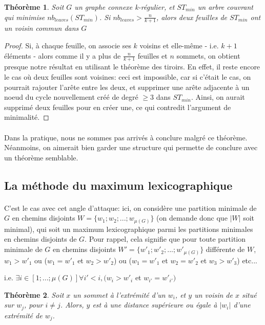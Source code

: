 \documentclass[a4paper]{article}
\newtheorem{theorem}{Théorème}
\theoremstyle{definition}
\theoremstyle{remark}
\begin{document}
\begin{theorem}
Soit $G$ un graphe connexe k-régulier, et $ST_{min}$ un arbre couvrant 
qui minimise $nb_{leaves}(ST_{min})$. Si $nb_{leaves} > \frac{n}{k+1}$,
alors deux feuilles de $ST_{min}$ ont un voisin commun dans $G$
\end{theorem}
\begin{proof}
Si, à chaque feuille, on associe ses $k$ voisins et elle-même - i.e. $k+1$ éléments - alors comme il y a plus de $\frac{n}{k+1}$ feuilles et $n$
sommets, on obtient presque notre résultat en utilisant le théorème des
tiroirs. En effet, il reste encore le cas où deux feuilles sont
voisines: ceci est impossible, car si c'était le cas, on pourrait 
rajouter l'arête entre les deux, et supprimer une arête adjacente à un
noeud du cycle nouvellement créé de degré $\geq 3$ dans $ST_{min}$. 
Ainsi, on aurait supprimé deux feuilles pour en créer une, ce qui contredit
l'argument de minimalité.
\end{proof}

\paragraph{}
Dans la pratique, nous ne sommes pas arrivés à conclure malgré ce théorème. Néanmoins, on aimerait bien garder une structure qui permette
de conclure avec un théorème semblable.

\subsection{La méthode du maximum lexicographique}

\paragraph{}
C'est le cas avec cet angle d'attaque: ici, on considère une partition minimale de $G$ en chemins disjoints $W = \{w_{1};w_{2};...;w_{\mu(G)}\}$ (on demande donc que $|W|$ soit minimal), qui soit un maximum 
lexicographique parmi les partitions minimales en chemins disjoints de $G$. Pour rappel, cela signifie que pour toute partition minimale de $G$ 
en chemins disjoints $W'=\{w'_{1};w'_{2};...;w'_{\mu(G)}\}$ différente de $W$, $w_{1} > w'_{1}$ ou ($w_{1}=w'_{1}$ et $w_{2} > w'_{2}$) ou ($w_{1}=w'_{1}$ et $w_{2} = w'_{2}$ et $w_{3} > w'_{3}$) etc...

i.e. $\exists i \in [1;...;\mu(G)] \forall i' < i, (w_{i} > w'_{i}$ et $w_{i'}=w'_{i'})$

\begin{theorem}
Soit $x$ un sommet à l'extrémité d'un $w_{i}$, et $y$ un voisin de $x$
situé sur $w_{j}$, pour $i \neq j$. Alors, $y$ est à une distance supérieure ou égale à $|w_{i}|$ d'une extrémité de $w_{j}$.
\end{theorem}
\end{document}
